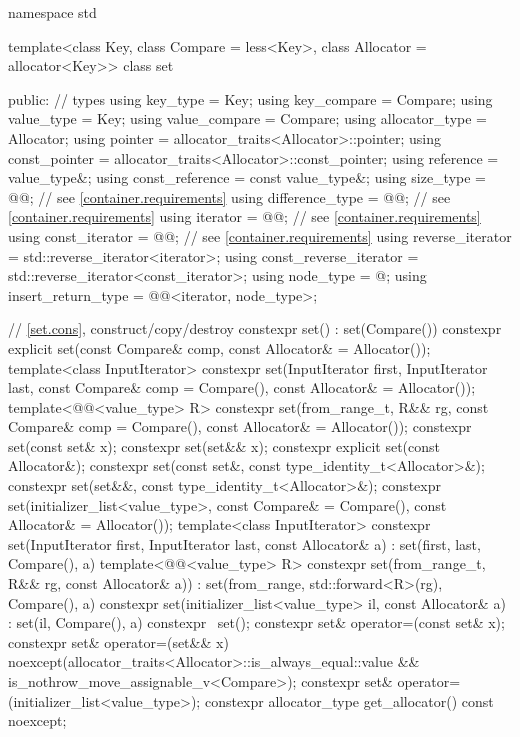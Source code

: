 \begin{codeblock}
namespace std {
  template<class Key, class Compare = less<Key>,
           class Allocator = allocator<Key>>
  class set {
  public:
    // types
    using key_type               = Key;
    using key_compare            = Compare;
    using value_type             = Key;
    using value_compare          = Compare;
    using allocator_type         = Allocator;
    using pointer                = allocator_traits<Allocator>::pointer;
    using const_pointer          = allocator_traits<Allocator>::const_pointer;
    using reference              = value_type&;
    using const_reference        = const value_type&;
    using size_type              = @@; // see \ref{container.requirements}
    using difference_type        = @@; // see \ref{container.requirements}
    using iterator               = @@; // see \ref{container.requirements}
    using const_iterator         = @@; // see \ref{container.requirements}
    using reverse_iterator       = std::reverse_iterator<iterator>;
    using const_reverse_iterator = std::reverse_iterator<const_iterator>;
    using node_type              = @\unspec@;
    using insert_return_type     = @@<iterator, node_type>;

    // \ref{set.cons}, construct/copy/destroy
    constexpr set() : set(Compare()) { }
    constexpr explicit set(const Compare& comp, const Allocator& = Allocator());
    template<class InputIterator>
      constexpr set(InputIterator first, InputIterator last,
                    const Compare& comp = Compare(), const Allocator& = Allocator());
    template<@@<value_type> R>
      constexpr set(from_range_t, R&& rg,
                    const Compare& comp = Compare(), const Allocator& = Allocator());
    constexpr set(const set& x);
    constexpr set(set&& x);
    constexpr explicit set(const Allocator&);
    constexpr set(const set&, const type_identity_t<Allocator>&);
    constexpr set(set&&, const type_identity_t<Allocator>&);
    constexpr set(initializer_list<value_type>,
                  const Compare& = Compare(), const Allocator& = Allocator());
    template<class InputIterator>
      constexpr set(InputIterator first, InputIterator last, const Allocator& a)
        : set(first, last, Compare(), a) { }
    template<@@<value_type> R>
      constexpr set(from_range_t, R&& rg, const Allocator& a))
        : set(from_range, std::forward<R>(rg), Compare(), a) { }
    constexpr set(initializer_list<value_type> il, const Allocator& a)
      : set(il, Compare(), a) { }
    constexpr ~set();
    constexpr set& operator=(const set& x);
    constexpr set& operator=(set&& x)
      noexcept(allocator_traits<Allocator>::is_always_equal::value &&
               is_nothrow_move_assignable_v<Compare>);
    constexpr set& operator=(initializer_list<value_type>);
    constexpr allocator_type get_allocator() const noexcept;

}}
\end{codeblock}
